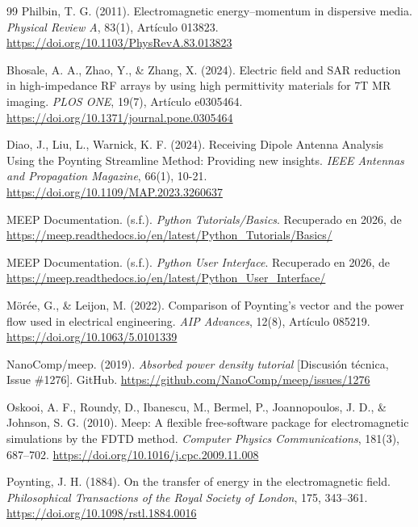 \begin{thebibliography}{99}
Philbin, T. G. (2011). Electromagnetic energy–momentum in dispersive media. \textit{Physical Review A}, 83(1), Artículo 013823. \url{https://doi.org/10.1103/PhysRevA.83.013823}

Bhosale, A. A., Zhao, Y., \& Zhang, X. (2024). Electric field and SAR reduction in high-impedance RF arrays by using high permittivity materials for 7T MR imaging. \textit{PLOS ONE}, 19(7), Artículo e0305464. \url{https://doi.org/10.1371/journal.pone.0305464}

Diao, J., Liu, L., Warnick, K. F. (2024). Receiving Dipole Antenna Analysis Using the Poynting Streamline Method: Providing new insights. \textit{IEEE Antennas and Propagation Magazine}, 66(1), 10-21. \url{https://doi.org/10.1109/MAP.2023.3260637}

MEEP Documentation. (s.f.). \textit{Python Tutorials/Basics}. Recuperado en 2026, de \url{https://meep.readthedocs.io/en/latest/Python_Tutorials/Basics/}

MEEP Documentation. (s.f.). \textit{Python User Interface}. Recuperado en 2026, de \url{https://meep.readthedocs.io/en/latest/Python_User_Interface/}

Mörée, G., \& Leijon, M. (2022). Comparison of Poynting's vector and the power flow used in electrical engineering. \textit{AIP Advances}, 12(8), Artículo 085219. \url{https://doi.org/10.1063/5.0101339}

NanoComp/meep. (2019). \textit{Absorbed power density tutorial} [Discusión técnica, Issue \#1276]. GitHub. \url{https://github.com/NanoComp/meep/issues/1276}

Oskooi, A. F., Roundy, D., Ibanescu, M., Bermel, P., Joannopoulos, J. D., \& Johnson, S. G. (2010). Meep: A flexible free-software package for electromagnetic simulations by the FDTD method. \textit{Computer Physics Communications}, 181(3), 687--702. \url{https://doi.org/10.1016/j.cpc.2009.11.008}

Poynting, J. H. (1884). On the transfer of energy in the electromagnetic field. \textit{Philosophical Transactions of the Royal Society of London}, 175, 343--361. \url{https://doi.org/10.1098/rstl.1884.0016}


\end{thebibliography}

